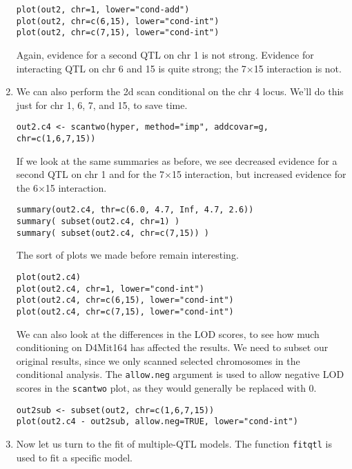 \documentclass[10pt,letterpaper]{article}
\newcommand{\usercolor}{\color [named]{BlueViolet}}
\begin{document}
\begin{enumerate}
\usercolor \verb|plot(out2, chr=1, lower="cond-add")| \\
\verb|plot(out2, chr=c(6,15), lower="cond-int")| \\
\verb|plot(out2, chr=c(7,15), lower="cond-int")| \normalcolor

Again, evidence for a second QTL on chr 1 is not strong.
Evidence for interacting QTL on chr 6 and 15 is quite strong;
the 7$\times$15 interaction is not.  

\item We can also perform the 2d scan conditional on the chr 4
  locus.  We'll do this just for chr 1, 6, 7, and 15, to save
  time.

\usercolor \verb|out2.c4 <- scantwo(hyper, method="imp", addcovar=g, chr=c(1,6,7,15))| \normalcolor

  If we look at the same summaries as before, we see decreased
  evidence for a second QTL on chr 1 and for the 7$\times$15
  interaction, but increased evidence for the 6$\times$15 interaction.

\usercolor \verb|summary(out2.c4, thr=c(6.0, 4.7, Inf, 4.7, 2.6))| \\
\verb|summary( subset(out2.c4, chr=1) )| \\
\verb|summary( subset(out2.c4, chr=c(7,15)) )| 
\normalcolor

  The sort of plots we made before remain interesting.

\usercolor \verb|plot(out2.c4)| \\
\verb|plot(out2.c4, chr=1, lower="cond-int")| \\
\verb|plot(out2.c4, chr=c(6,15), lower="cond-int")| \\
\verb|plot(out2.c4, chr=c(7,15), lower="cond-int")| \normalcolor

  We can also look at the differences in the LOD scores, to see how
  much conditioning on D4Mit164 has affected the results.  We need to
  subset our original results, since we only scanned selected
  chromosomes in the conditional analysis.  The \verb-allow.neg-
  argument is used to allow negative LOD scores in the \verb-scantwo-
  plot, as they would generally be replaced with 0.  

\usercolor \verb|out2sub <- subset(out2, chr=c(1,6,7,15))| \\
\verb|plot(out2.c4 - out2sub, allow.neg=TRUE, lower="cond-int")|
\normalcolor

\item Now let us turn to the fit of multiple-QTL models.  The function
  \verb-fitqtl- is used to fit a specific model. 


\end{enumerate}
\end{document}
